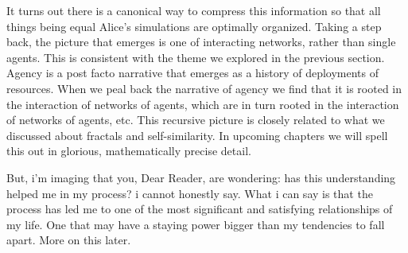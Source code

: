 It turns out there is a canonical way to compress this information so that all things being equal Alice's simulations are optimally organized. Taking a step back, the picture that emerges is one of interacting networks, rather than single agents. This is consistent with the theme we explored in the previous section. Agency is a post facto narrative that emerges as a history of deployments of resources. When we peal back the narrative of agency we find that it is rooted in the interaction of networks of agents, which are in turn rooted in the interaction of networks of agents, etc. This recursive picture is closely related to what we discussed about fractals and self-similarity. In upcoming chapters we will spell this out in glorious, mathematically precise detail.

But, i'm imaging that you, Dear Reader, are wondering: has this understanding helped me in my process? i cannot honestly say. What i can say is that the process has led me to one of the most significant and satisfying relationships of my life. One that may have a staying power bigger than my tendencies to fall apart. More on this later.
